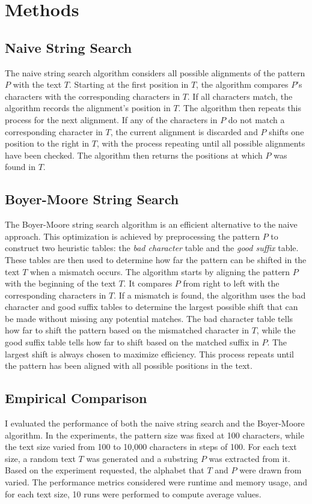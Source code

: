\documentclass[11pt, letterpaper]{article}
\begin{document}
\section{Methods}

\subsection{Naive String Search}
The naive string search algorithm considers all possible alignments of the pattern $P$ with the text $T$.
Starting at the first position in $T$, the algorithm compares $P$'s characters with the corresponding characters in $T$.
If all characters match, the algorithm records the alignment's position in $T$. 
The algorithm then repeats this process for the next alignment. 
If any of the characters in $P$ do not match a corresponding character in $T$, the current alignment is discarded and $P$ shifts one position to the right in $T$,
with the process repeating until all possible alignments have been checked. 
The algorithm then returns the positions at which $P$ was found in $T$.

\subsection{Boyer-Moore String Search}
The Boyer-Moore string search algorithm is an efficient alternative to the naive approach.
This optimization is achieved by preprocessing the pattern $P$ to construct two heuristic tables: the \emph{bad character} table and the \emph{good suffix} table.
These tables are then used to determine how far the pattern can be shifted in the text $T$ when a mismatch occurs.
The algorithm starts by aligning the pattern $P$ with the beginning of the text $T$.
It compares $P$ from right to left with the corresponding characters in $T$.
If a mismatch is found, the algorithm uses the bad character and good suffix tables to determine the largest possible shift that can be made without missing any potential matches.
The bad character table tells how far to shift the pattern based on the mismatched character in $T$, while the good suffix table tells how far to shift based on the matched suffix in $P$.
The largest shift is always chosen to maximize efficiency.
This process repeats until the pattern has been aligned with all possible positions in the text.

\subsection{Empirical Comparison}
I evaluated the performance of both the naive string search and the Boyer-Moore algorithm. 
In the experiments, the pattern size was fixed at 100 characters, 
while the text size varied from 100 to 10,000 characters in steps of 100. 
For each text size, a random text $T$ was generated and a substring $P$ was extracted from it. 
Based on the experiment requested, the alphabet that $T$ and $P$ were drawn from varied.
The performance metrics considered were runtime and memory usage, and for each text size, 
10 runs were performed to compute average values.
\end{document}
